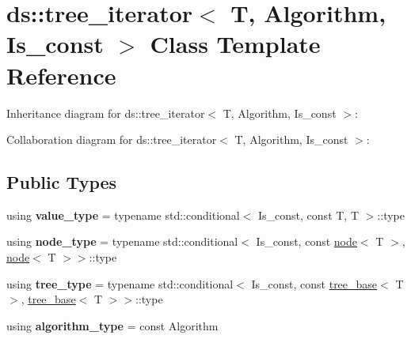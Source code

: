\hypertarget{classds_1_1tree__iterator}{}\section{ds\+:\+:tree\+\_\+iterator$<$ T, Algorithm, Is\+\_\+const $>$ Class Template Reference}
\label{classds_1_1tree__iterator}


Inheritance diagram for ds\+:\+:tree\+\_\+iterator$<$ T, Algorithm, Is\+\_\+const $>$\+:


Collaboration diagram for ds\+:\+:tree\+\_\+iterator$<$ T, Algorithm, Is\+\_\+const $>$\+:
\subsection*{Public Types}
\begin{DoxyCompactItemize}
\item 
using {\bfseries value\+\_\+type} = typename std\+::conditional$<$ Is\+\_\+const, const T, T $>$\+::type\hypertarget{classds_1_1tree__iterator_a7c3b03ca4786de58fbe8d3ef0a57dcdc}{}\label{classds_1_1tree__iterator_a7c3b03ca4786de58fbe8d3ef0a57dcdc}

\item 
using {\bfseries node\+\_\+type} = typename std\+::conditional$<$ Is\+\_\+const, const \hyperlink{classds_1_1node}{node}$<$ T $>$, \hyperlink{classds_1_1node}{node}$<$ T $>$$>$\+::type\hypertarget{classds_1_1tree__iterator_a936452e2673474a943d038cfca696020}{}\label{classds_1_1tree__iterator_a936452e2673474a943d038cfca696020}

\item 
using {\bfseries tree\+\_\+type} = typename std\+::conditional$<$ Is\+\_\+const, const \hyperlink{classds_1_1tree__base}{tree\+\_\+base}$<$ T $>$, \hyperlink{classds_1_1tree__base}{tree\+\_\+base}$<$ T $>$$>$\+::type\hypertarget{classds_1_1tree__iterator_aa9cccdd2827981d9993409ff687dac49}{}\label{classds_1_1tree__iterator_aa9cccdd2827981d9993409ff687dac49}

\item 
using {\bfseries algorithm\+\_\+type} = const Algorithm\hypertarget{classds_1_1tree__iterator_a978be0b5d013a464ec6fd1d08201f36b}{}\label{classds_1_1tree__iterator_a978be0b5d013a464ec6fd1d08201f36b}

\end{DoxyCompactItemize}
